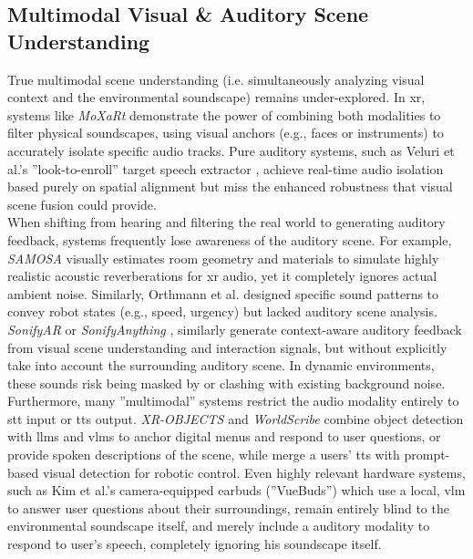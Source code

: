 \subsection{Multimodal Visual \& Auditory Scene Understanding}
\label{sec:visual_and_auditory_scene_understanding}
True multimodal scene understanding (i.e. simultaneously analyzing visual context and the environmental soundscape) remains under-explored. In \gls{xr}, systems like \textit{MoXaRt} \cite{Xu_26_TargetAudioXR} demonstrate the power of combining both modalities to filter physical soundscapes, using visual anchors (e.g., faces or instruments) to accurately isolate specific audio tracks. Pure auditory systems, such as Veluri et al.'s ''look-to-enroll'' target speech extractor \cite{Veluri_24_LookOnceToHearTargetSpeech}, achieve real-time audio isolation based purely on spatial alignment but miss the enhanced robustness that visual scene fusion could provide.\\
When shifting from hearing and filtering the real world to generating auditory feedback, systems frequently lose awareness of the auditory scene. For example, \textit{SAMOSA} \cite{Xu_25_RealistiRSoundBasedOnEnv} visually estimates room geometry and materials to simulate highly realistic acoustic reverberations for \gls{xr} audio, yet it completely ignores actual ambient noise. Similarly, Orthmann et al. \cite{Orthmann_23_SoundingRobots} designed specific sound patterns to convey robot states (e.g., speed, urgency) but lacked auditory scene analysis. \textit{SonifyAR} \cite{Su_24_SonifyAR} or \textit{SonifyAnything} \cite{Schütz_25_SonifyAnything}, similarly generate context-aware auditory feedback from visual scene understanding and interaction signals, but without explicitly take into account the surrounding auditory scene. In dynamic environments, these sounds risk being masked by or clashing with existing background noise.\\
Furthermore, many ''multimodal'' systems restrict the audio modality entirely to \gls{stt} input or \gls{tts} output. \textit{XR-OBJECTS} \cite{Dogan_24_ObjectIntelligenceInXR} and \textit{WorldScribe} \cite{Chang_24_WorldScribeLiveVisualDescriptions} combine object detection with \glspl{llm} and \glspl{vlm} to anchor digital menus and respond to user questions, or provide spoken descriptions of the scene, while \citet{Shen_26_VisualAndSpeechRobot} merge a users' \gls{tts} with prompt-based visual detection for robotic control. Even highly relevant hardware systems, such as Kim et al.'s camera-equipped earbuds \cite{Kim_26_EarbudsCamScene} (''VueBuds'') which use a local, \gls{vlm} to answer user questions about their surroundings, remain entirely blind to the environmental soundscape itself, and merely include a auditory modality to respond to user’s speech, completely ignoring his soundscape itself.
\\

